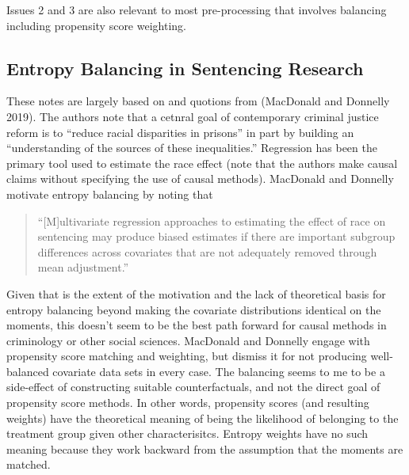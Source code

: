 \documentclass[
  letterpaper,
  DIV=11,
  numbers=noendperiod]{scrartcl}
\begin{document}
Issues 2 and 3 are also relevant to most pre-processing that involves
balancing including propensity score weighting.

\hypertarget{entropy-balancing-in-sentencing-research}{%
\subsection{Entropy Balancing in Sentencing
Research}\label{entropy-balancing-in-sentencing-research}}

These notes are largely based on and quotions from (MacDonald and
Donnelly 2019). The authors note that a cetnral goal of contemporary
criminal justice reform is to ``reduce racial disparities in prisons''
in part by building an ``understanding of the sources of these
inequalities.'' Regression has been the primary tool used to estimate
the race effect (note that the authors make causal claims without
specifying the use of causal methods). MacDonald and Donnelly motivate
entropy balancing by noting that

\begin{quote}
``{[}M{]}ultivariate regression approaches to estimating the effect of
race on sentencing may produce biased estimates if there are important
subgroup differences across covariates that are not adequately removed
through mean adjustment.''
\end{quote}

Given that is the extent of the motivation and the lack of theoretical
basis for entropy balancing beyond making the covariate distributions
identical on the moments, this doesn't seem to be the best path forward
for causal methods in criminology or other social sciences. MacDonald
and Donnelly engage with propensity score matching and weighting, but
dismiss it for not producing well-balanced covariate data sets in every
case. The balancing seems to me to be a side-effect of constructing
suitable counterfactuals, and not the direct goal of propensity score
methods. In other words, propensity scores (and resulting weights) have
the theoretical meaning of being the likelihood of belonging to the
treatment group given other characterisitcs. Entropy weights have no
such meaning because they work backward from the assumption that the
moments are matched.
\end{document}
